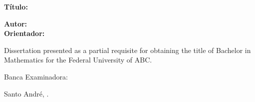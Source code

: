 \begin{minipage}{12cm}
{  \Large \textbf{Título:} \titulo } \\

\bigskip

{  \large \textbf{Autor:}  \autor \\}
{\large \textbf{Orientador:}  \orientador
}

\bigskip

Dissertation presented as a partial requisite for obtaining the title of Bachelor in Mathematics for the Federal University of ABC.

\end{minipage}
\vfill
\hspace{7cm}\begin{minipage}{9cm}
{\Large Banca Examinadora:}\vspace{0.4cm}

\textbf{\membroa}

\insta \vspace{0.4cm}

\textbf{\membrob}

\instb\vspace{0.8cm}

 Santo André, \data.
\end{minipage}












 
